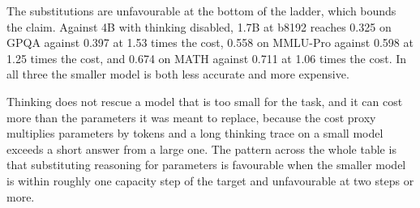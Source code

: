 The substitutions are unfavourable at the bottom of the ladder, which bounds the claim.
Against 4B with thinking disabled, 1.7B at b8192 reaches 0.325 on GPQA against 0.397 at
1.53 times the cost, 0.558 on MMLU-Pro against 0.598 at 1.25 times the cost, and 0.674 on
MATH against 0.711 at 1.06 times the cost. In all three the smaller model is both less
accurate and more expensive.

Thinking does not rescue a model that is too small for the task, and it can cost more than
the parameters it was meant to replace, because the cost proxy multiplies parameters by
tokens and a long thinking trace on a small model exceeds a short answer from a large one.
The pattern across the whole table is that substituting reasoning for parameters is
favourable when the smaller model is within roughly one capacity step of the target and
unfavourable at two steps or more.
